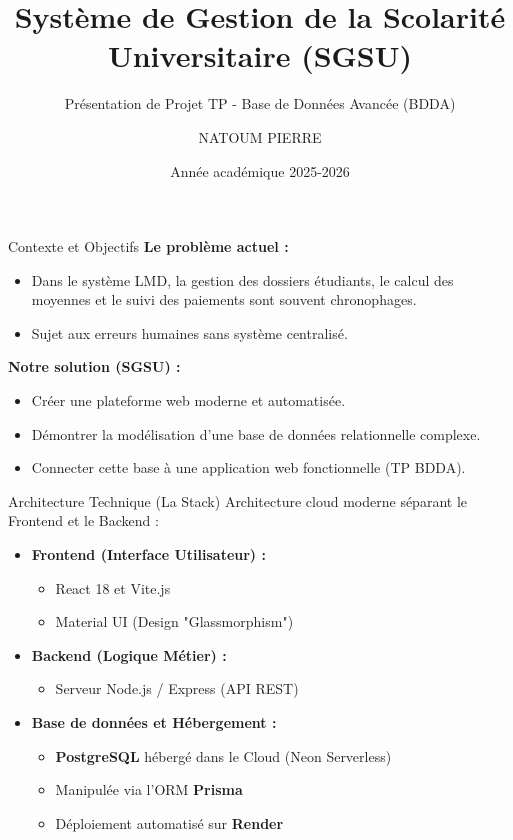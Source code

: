 \documentclass{beamer}
\title[Projet SGSU]{Système de Gestion de la Scolarité Universitaire (SGSU)}
\subtitle{Présentation de Projet TP - Base de Données Avancée (BDDA)}
\author{NATOUM PIERRE}
\institute[BDDA]{Enseignant : BRAHIM ISSA HASSABALLAH}
\date{Année académique 2025-2026}
\begin{document}
\begin{frame}
    \titlepage
\end{frame}

\begin{frame}{Contexte et Objectifs}
    \textbf{Le problème actuel :} 
    \begin{itemize}
        \item Dans le système LMD, la gestion des dossiers étudiants, le calcul des moyennes et le suivi des paiements sont souvent chronophages.
        \item Sujet aux erreurs humaines sans système centralisé.
    \end{itemize}
    
    \vspace{0.5cm}
    \textbf{Notre solution (SGSU) :}
    \begin{itemize}
        \item Créer une plateforme web moderne et automatisée.
        \item Démontrer la modélisation d'une base de données relationnelle complexe.
        \item Connecter cette base à une application web fonctionnelle (TP BDDA).
    \end{itemize}
\end{frame}

\begin{frame}{Architecture Technique (La Stack)}
    Architecture cloud moderne séparant le Frontend et le Backend :
    
    \begin{itemize}
        \item \textbf{Frontend (Interface Utilisateur) :}
        \begin{itemize}
            \item React 18 et Vite.js
            \item Material UI (Design "Glassmorphism")
        \end{itemize}
        \item \textbf{Backend (Logique Métier) :}
        \begin{itemize}
            \item Serveur Node.js / Express (API REST)
        \end{itemize}
        \item \textbf{Base de données et Hébergement :}
        \begin{itemize}
            \item \textbf{PostgreSQL} hébergé dans le Cloud (Neon Serverless)
            \item Manipulée via l'ORM \textbf{Prisma}
            \item Déploiement automatisé sur \textbf{Render}
        \end{itemize}
    \end{itemize}
\end{frame}
\end{document}
